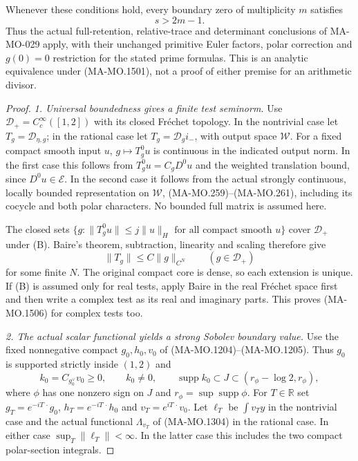 Whenever these conditions hold, every boundary zero of
multiplicity $m$ satisfies
\[
                         s>2m-1 .
\tag{MA-MO.1505}
\]
Thus the actual full-retention, relative-trace and determinant
conclusions of MA-MO-029 apply, with their unchanged primitive
Euler factors, polar correction and $g(0)=0$ restriction for
the stated prime formulas.  This is an analytic equivalence
under (MA-MO.1501), not a proof of either premise for an
arithmetic divisor.

\begin{proof}
\emph{1. Universal boundedness gives a finite test seminorm.}
Use $\mathcal D_+=C_c^\infty([1,2])$ with its closed
Fr\'echet topology.  In the nontrivial case let
$T_g=\mathscr D_{\eta,g}$; in the rational case let
$T_g=\mathscr D_g i_-$, with output space $\mathcal W$.
For a fixed compact smooth input $u$, $g\mapsto T_g^0u$
is continuous in the indicated output norm.  In the first
case this follows from $T_g^0u=C_gD^0u$ and the weighted
translation bound, since $D^0u\in\mathcal E$.  In the
second case it follows from the actual strongly continuous,
locally bounded representation on $\mathcal W$,
(MA-MO.259)--(MA-MO.261), including its cocycle and both
polar characters.  No bounded full matrix is assumed here.

The closed sets
$\{g:\|T_g^0u\|\le j\|u\|_H\text{ for all compact smooth }u\}$
cover $\mathcal D_+$ under (B).  Baire's theorem, subtraction,
linearity and scaling therefore give
\[
              \|T_g\|\le C\|g\|_{C^N}
                         \qquad(g\in\mathcal D_+)
\tag{MA-MO.1506}
\]
for some finite $N$.  The original compact core is dense,
so each extension is unique.  If (B) is assumed only for
real tests, apply Baire in the real Fr\'echet space first
and then write a complex test as its real and imaginary
parts.  This proves (MA-MO.1506) for complex tests too.

\emph{2. The actual scalar functional yields a strong Sobolev boundary value.}
Use the fixed nonnegative compact $g_0,h_0,v_0$ of
(MA-MO.1204)--(MA-MO.1205).  Thus $g_0$ is supported
strictly inside $(1,2)$ and
\[
 k_0=C_{g_0^\vee}v_0\ge0,\qquad k_0\ne0,\qquad
 \operatorname{supp}k_0\subset J\subset(r_\phi-\log2,r_\phi),
\tag{MA-MO.1507}
\]
where $\phi$ has one nonzero sign on $J$ and
$r_\phi=\sup\operatorname{supp}\phi$.
For $T\in\mathbb R$ set
$g_T=e^{-iT\,\cdot}g_0$, $h_T=e^{-iT\,\cdot}h_0$ and
$v_T=e^{iT\,\cdot}v_0$.
Let $\ell_T$ be $\int v_Ty$ in the nontrivial case and
the actual functional $\Lambda_{v_T}$ of (MA-MO.1304)
in the rational case.  In either case
$\sup_T\|\ell_T\|<\infty$.  In the latter case this
includes the two compact polar-section integrals.


\end{proof}
